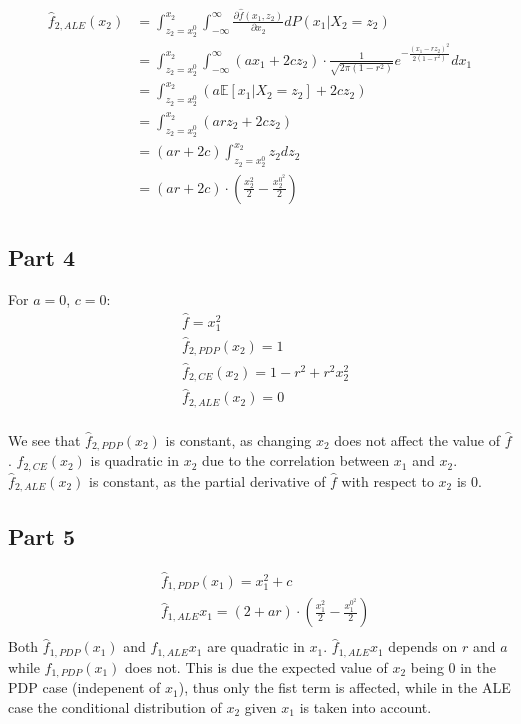 \documentclass{article}
\begin{document}
\begin{align*}
    \hat{f}_{2,ALE}(x_2) &= \int_{z_2 = x_2^0}^{x_2}\int_{-\infty}^{\infty}\frac{\partial\hat{f}(x_1,z_2)}{\partial x_2}dP(x_1|X_2=z_2) \\
    &= \int_{z_2 = x_2^0}^{x_2}\int_{-\infty}^{\infty}(ax_1 + 2cz_2) \cdot \frac{1}{\sqrt{2\pi(1-r^2)}}e^{-\frac{(x_1 - rz_2)^2}{2(1-r^2)}}dx_1 \\
    &= \int_{z_2 = x_2^0}^{x_2}(a\mathbb{E}[x_1 | X_2 = z_2] + 2cz_2) \\
    &= \int_{z_2 = x_2^0}^{x_2}(arz_2 + 2cz_2) \\
    &= (ar + 2c)\int_{z_2 = x_2^0}^{x_2}z_2 dz_2 \\
    &= (ar + 2c) \cdot (\frac{x_2^2}{2} - \frac{x_2^{0^2}}{2}) \\
\end{align*}

\subsection{Part 4}
For $a=0$, $c=0$: \\
\begin{align*}
    &\hat{f} = x_1^2 \\
    &\hat{f}_{2,PDP}(x_2) = 1 \\
    &\hat{f}_{2,CE}(x_2) = 1 - r^2 + r^2x_2^2 \\
    &\hat{f}_{2,ALE}(x_2) = 0 \\
\end{align*}

We see that $\hat{f}_{2,PDP}(x_2)$ is constant, as changing $x_2$ does not affect the value of $\hat{f}$. $\hat{f}_{2,CE}(x_2)$ is quadratic in $x_2$ due to the correlation between $x_1$ and $x_2$. $\hat{f}_{2,ALE}(x_2)$ is constant, as the partial derivative of $\hat{f}$ with respect to $x_2$ is 0.

\subsection{Part 5}
\begin{align*}
    &\hat{f}_{1,PDP}(x_1) = x_1^2 + c \\
    &\hat{f}_{1,ALE}{x_1} = (2 + ar) \cdot (\frac{x_1^2}{2} - \frac{x_1^{0^2}}{2}) \\
\end{align*}
Both $\hat{f}_{1,PDP}(x_1)$ and $\hat{f}_{1,ALE}{x_1}$ are quadratic in $x_1$. $\hat{f}_{1,ALE}{x_1}$ depends on $r$ and $a$ while $\hat{f}_{1,PDP}(x_1)$ does not. This is due the expected value of $x_2$ being 0 in the PDP case (indepenent of $x_1$), thus only the fist term is affected, while in the ALE case the conditional distribution of $x_2$ given $x_1$ is taken into account.
\end{document}
